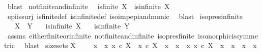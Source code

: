 \begin{isabellebody}
\ blast%
\endisatagproof
{\isafoldproof}%
%
\isadelimproof
\isanewline
%
\endisadelimproof
\isanewline
{}\isamarkupfalse%
\ not{\isacharunderscore}{\kern0pt}finite{\isacharunderscore}{\kern0pt}and{\isacharunderscore}{\kern0pt}infinite{\isacharcolon}{\kern0pt}\isanewline
\ \ {\isachardoublequoteopen}{\isasymnot}{\isacharparenleft}{\kern0pt}is{\isacharunderscore}{\kern0pt}finite\ X\ {\isasymand}\ is{\isacharunderscore}{\kern0pt}infinite\ X{\isacharparenright}{\kern0pt}{\isachardoublequoteclose}\isanewline
%
\isadelimproof
\ \ %
\endisadelimproof
%
\isatagproof
{}\isamarkupfalse%
\ epi{\isacharunderscore}{\kern0pt}is{\isacharunderscore}{\kern0pt}surj\ is{\isacharunderscore}{\kern0pt}finite{\isacharunderscore}{\kern0pt}def\ is{\isacharunderscore}{\kern0pt}infinite{\isacharunderscore}{\kern0pt}def\ iso{\isacharunderscore}{\kern0pt}imp{\isacharunderscore}{\kern0pt}epi{\isacharunderscore}{\kern0pt}and{\isacharunderscore}{\kern0pt}monic\ \isamarkupfalse%
\ blast%
\endisatagproof
{\isafoldproof}%
%
\isadelimproof
\isanewline
%
\endisadelimproof
\isanewline
{}\isamarkupfalse%
\ iso{\isacharunderscore}{\kern0pt}pres{\isacharunderscore}{\kern0pt}infinite{\isacharcolon}{\kern0pt}\isanewline
\ \ \ {\isachardoublequoteopen}X\ {\isasymcong}\ Y{\isachardoublequoteclose}\isanewline
\ \ \ {\isachardoublequoteopen}is{\isacharunderscore}{\kern0pt}infinite\ X{\isachardoublequoteclose}\isanewline
\ \ \ {\isachardoublequoteopen}is{\isacharunderscore}{\kern0pt}infinite\ Y{\isachardoublequoteclose}\isanewline
%
\isadelimproof
\ \ %
\endisadelimproof
%
\isatagproof
{}\isamarkupfalse%
\ assms\ either{\isacharunderscore}{\kern0pt}finite{\isacharunderscore}{\kern0pt}or{\isacharunderscore}{\kern0pt}infinite\ not{\isacharunderscore}{\kern0pt}finite{\isacharunderscore}{\kern0pt}and{\isacharunderscore}{\kern0pt}infinite\ iso{\isacharunderscore}{\kern0pt}pres{\isacharunderscore}{\kern0pt}finite\ isomorphic{\isacharunderscore}{\kern0pt}is{\isacharunderscore}{\kern0pt}symmetric\ \isamarkupfalse%
\ blast%
\endisatagproof
{\isafoldproof}%
%
\isadelimproof
\isanewline
%
\endisadelimproof
\isanewline
{}\isamarkupfalse%
\ size{\isacharunderscore}{\kern0pt}{}{\isacharunderscore}{\kern0pt}sets{\isacharcolon}{\kern0pt}\isanewline
{\isachardoublequoteopen}{\isacharparenleft}{\kern0pt}X\ {\isasymcong}\ {\isasymOmega}{\isacharparenright}{\kern0pt}\ {\isacharequal}{\kern0pt}\ {\isacharparenleft}{\kern0pt}{\isasymexists}\ x{}{\isachardot}{\kern0pt}\ {\isasymexists}\ x{}{\isachardot}{\kern0pt}\ x{}\ {\isasymin}\isactrlsub c\ X\ {\isasymand}\ x{}\ {\isasymin}\isactrlsub c\ X\ {\isasymand}\ x{}\ {\isasymnoteq}\ x{}\ {\isasymand}\ {\isacharparenleft}{\kern0pt}{\isasymforall}x{\isachardot}{\kern0pt}\ x\ {\isasymin}\isactrlsub c\ X\ {\isasymlongrightarrow}\ x\ {\isacharequal}{\kern0pt}\ x{}\ {\isasymor}\ x\ {\isacharequal}{\kern0pt}\ x{}{\isacharparenright}{\kern0pt}{\isacharparenright}{\kern0pt}{\isachardoublequoteclose}\isanewline

\end{isabellebody}
